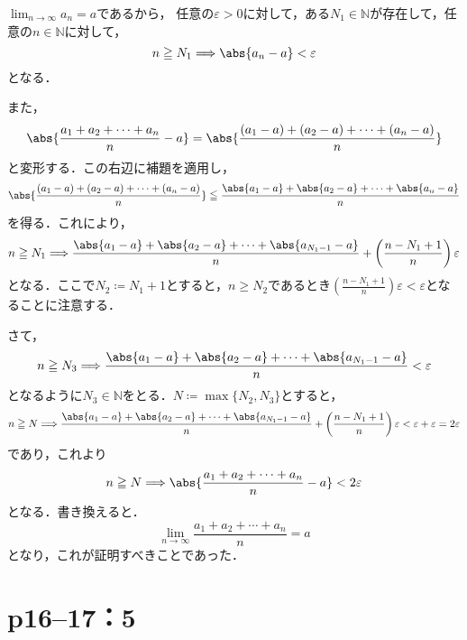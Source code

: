 \begin{tproof}
    $\lim_{n \to \infty} a_n =a$であるから，
    任意の$\varepsilon >0$に対して，ある$N_1 \in \mathbb{N}$が存在して，任意の$n \in \mathbb{N}$に対して，
    \[
        n \ge N_1 \Longrightarrow \abs{a_n -a}<\varepsilon
    \]
    となる．

    また，
    \[
        \abs{\frac{a_1+a_2+\cdots+a_n}{n}-a}= \abs{\frac{(a_1-a)+(a_2-a)+\cdots+(a_n-a)}{n}}
    \]
    と変形する．この右辺に補題を適用し，
    \[
        \abs{\frac{(a_1-a)+(a_2-a)+\cdots+(a_n-a)}{n}} \leqq \frac{\abs{a_1-a}+\abs{a_2-a}+\cdots+\abs{a_n-a}}{n}
    \]
    を得る．これにより，
    \[
        n \ge N_1 \Longrightarrow \frac{\abs{a_1-a}+\abs{a_2-a}+\cdots+\abs{a_{N_1-1}-a}}{n} +\left( \frac{n-N_1+1}{n} \right ) \varepsilon
    \]
    となる．ここで$N_2 \coloneqq N_1 +1$とすると，$n \ge N_2$であるとき$\left( \frac{n-N_1+1}{n} \right ) \varepsilon < \varepsilon$となることに注意する．

    さて，
    \[
        n \ge N_3 \Longrightarrow \frac{\abs{a_1-a}+\abs{a_2-a}+\cdots+\abs{a_{N_1-1}-a}}{n}<\varepsilon
    \]
    となるように$N_3 \in \mathbb{N}$をとる．$N \coloneqq \max \{ N_2 , N_3 \}$とすると，
    \[
        n \ge N \Longrightarrow \frac{\abs{a_1-a}+\abs{a_2-a}+\cdots+\abs{a_{N_1-1}-a}}{n} +\left( \frac{n-N_1+1}{n} \right ) \varepsilon < \varepsilon + \varepsilon = 2 \varepsilon
    \]
    であり，これより
    \[
        n \ge N \Longrightarrow \abs{\frac{a_1+a_2+\cdots+a_n}{n}-a} < 2 \varepsilon
    \]
    となる．書き換えると．
    \[
        \lim_{n \to \infty} \frac{a_1+a_2+\cdots+a_n}{n}=a
    \]
    となり，これが証明すべきことであった．
\end{tproof}



\section*{p16--17：5}

